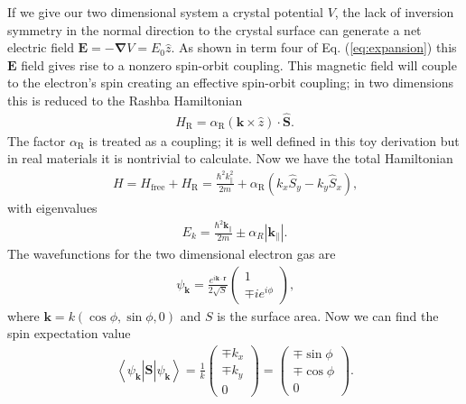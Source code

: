 \documentclass[12pt]{article}
\begin{document}
If we give our two dimensional system a crystal potential $V$, the lack of inversion symmetry in the normal direction to the crystal surface can generate a net electric field $\boldsymbol{E}=-\boldsymbol{\nabla}V=E_0\hat{z}$.
As shown in term four of Eq. (\ref{eq:expansion}) this $\boldsymbol{E}$ field gives rise to a nonzero spin-orbit coupling.
This magnetic field will couple to the electron's spin creating an effective spin-orbit coupling; in two dimensions this is reduced to the Rashba Hamiltonian
\begin{align}
  \label{eq:rashba}
  H_{\text{R}}=\alpha_{\text{R}}(\boldsymbol{k}\times\hat{z})\cdot\hat{\boldsymbol{S}}\text{.}
\end{align}
The factor $\alpha_{\text{R}}$ is treated as a coupling; it is well defined in this toy derivation but in real materials it is nontrivial to calculate.
Now we have the total Hamiltonian
\begin{align}
  \label{eq:totalH}
  H=H_{\text{free}}+H_{\text{R}}=\frac{\hbar^2k_\parallel^2}{2m}+\alpha_{\text{R}}(k_x\hat{S}_y-k_y\hat{S}_x)\text{,}
\end{align}
with eigenvalues
\begin{align}
  \label{eq:eigenvalues}
  E_k=\frac{\hbar^2\boldsymbol{k}_{\parallel}}{2m}\pm\alpha_{R}\left|\boldsymbol{k}_{\parallel}\right|\text{.}
\end{align}
The wavefunctions for the two dimensional electron gas are
\begin{align}
  \label{eq:wavefn}
  \psi_{\boldsymbol{k}}=\frac{e^{i\boldsymbol{k}\cdot\boldsymbol{r}}}{2\sqrt{S}}\left(\begin{array}{c} 1 \\ \mp ie^{i\phi} \end{array} \right)\text{,}
\end{align}
where $\boldsymbol{k}=k(\cos\phi,\sin\phi,0)$ and $S$ is the surface area.
Now we can find the spin expectation value
\begin{align}
  \label{eq:expectation}
  \left<\psi_{\boldsymbol{k}}\left|\hat{\boldsymbol{S}}\right|\psi_{\boldsymbol{k}}\right>=\frac{1}{k}\left(\begin{array}{c} \mp k_x \\ \mp k_y \\ 0 \end{array} \right) = \left(\begin{array}{c} \mp \sin\phi \\ \mp \cos\phi \\ 0 \end{array} \right)\text{.}
\end{align}
\end{document}
